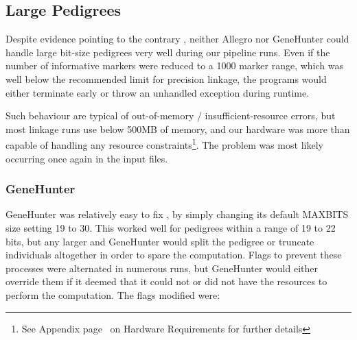 \subsection{Large Pedigrees}\label{ref:meth:largepeds}

Despite evidence pointing to the contrary \citep{allegro_2005,ghm_2014}, neither Allegro nor GeneHunter could handle large bit-size pedigrees very well during our pipeline runs. Even if the number of informative markers were reduced to a 1000 marker range, which was well below the recommended limit for precision linkage, the programs would either terminate early or throw an unhandled exception during runtime.
\enlargethispage{\baselineskip}

Such behaviour are typical of out-of-memory / insufficient-resource errors, but most linkage runs use below 500MB of memory, and our hardware was more than capable of handling any resource constraints\footnote{See Appendix page~\pageref{ref:app:hwspec} on Hardware Requirements for further details}. The problem was most likely occurring once again in the input files.

\subsubsection{GeneHunter}

GeneHunter was relatively easy to fix , by simply changing its default MAXBITS size setting 19 to 30. This worked well for pedigrees within a range of 19 to 22 bits, but any larger and GeneHunter would split the pedigree or truncate individuals altogether in order to spare the computation. Flags to prevent these processes were alternated in numerous runs, but GeneHunter would either override them if it deemed that it could not or did not have the resources to perform the computation. The flags modified were:

